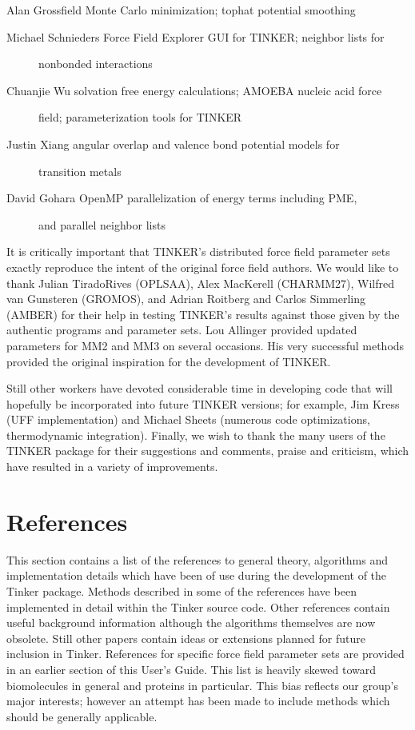 \documentclass[letterpaper,11pt,english]{sphinxmanual}
\begin{document}
Alan Grossfield Monte Carlo minimization; tophat potential smoothing
\begin{description}
\item[{Michael Schnieders      Force Field Explorer GUI for TINKER; neighbor lists for}] \leavevmode
nonbonded interactions

\item[{Chuanjie Wu     solvation free energy calculations; AMOEBA nucleic acid force}] \leavevmode
field; parameterization tools for TINKER

\item[{Justin Xiang    angular overlap and valence bond potential models for}] \leavevmode
transition metals

\item[{David Gohara    OpenMP parallelization of energy terms including PME,}] \leavevmode
and parallel neighbor lists

\end{description}

It is critically important that TINKER’s distributed force field parameter sets exactly reproduce the intent of the original force field authors. We would like to thank Julian Tirado\sphinxhyphen{}Rives (OPLS\sphinxhyphen{}AA), Alex MacKerell (CHARMM27), Wilfred van Gunsteren (GROMOS), and Adrian Roitberg and Carlos Simmerling (AMBER) for their help in testing TINKER’s results against those given by the authentic programs and parameter sets. Lou Allinger provided updated parameters for MM2 and MM3 on several occasions. His very successful methods provided the original inspiration for the development of TINKER.

Still other workers have devoted considerable time in developing code that will hopefully be incorporated into future TINKER versions; for example, Jim Kress (UFF implementation) and Michael Sheets (numerous code optimizations, thermodynamic integration). Finally, we wish to thank the many users of the TINKER package for their suggestions and comments, praise and criticism, which have resulted in a variety of improvements.


\chapter{References}
\label{\detokenize{text/references:references}}\label{\detokenize{text/references::doc}}
This section contains a list of the references to general theory, algorithms and implementation details which have been of use during the development of the Tinker package. Methods described in some of the references have been implemented in detail within the Tinker source code. Other references contain useful background information although the algorithms themselves are now obsolete. Still other papers contain ideas or extensions planned for future inclusion in Tinker. References for specific force field parameter sets are provided in an earlier section of this User’s Guide. This list is heavily skewed toward biomolecules in general and proteins in particular. This bias reflects our group’s major interests; however an attempt has been made to include methods which should be generally applicable.
\end{document}
